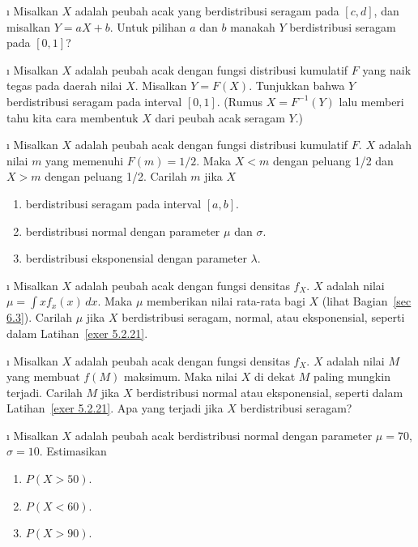 \begin{LJSItem}
\i\label{exer 5.2.19} Misalkan $X$ adalah peubah acak yang berdistribusi seragam pada
$[c,d]$, dan misalkan $Y = aX + b$.  Untuk pilihan $a$ dan $b$ manakah $Y$
berdistribusi seragam pada $[0,1]$?

\i\label{exer 5.2.20} Misalkan $X$ adalah peubah acak dengan fungsi distribusi
kumulatif $F$ yang naik tegas pada daerah nilai $X$.  Misalkan $Y = F(X)$.  Tunjukkan
bahwa $Y$ berdistribusi seragam pada interval $[0,1]$.  (Rumus $X = F^{-1}(Y)$ lalu
memberi tahu kita cara membentuk $X$ dari peubah acak seragam $Y$.)

\i\label{exer 5.2.21} Misalkan $X$ adalah peubah acak dengan fungsi distribusi
kumulatif $F$.   $X$ adalah nilai $m$ yang memenuhi $F(m) = 1/2$.  Maka
$X < m$ dengan peluang 1/2 dan $X > m$ dengan peluang 1/2.  Carilah $m$ jika $X$
\begin{enumerate}
\item berdistribusi seragam pada interval $[a,b]$.

\item berdistribusi normal dengan parameter $\mu$ dan $\sigma$.

\item berdistribusi eksponensial dengan parameter $\lambda$.
\end{enumerate}

\i\label{exer 5.2.22} Misalkan $X$ adalah peubah acak dengan fungsi densitas $f_X$.
 $X$ adalah nilai $\mu = \int xf_x(x)\,dx$.  Maka $\mu$ memberikan
nilai rata-rata bagi $X$ (lihat Bagian~\ref{sec 6.3}).  Carilah $\mu$ jika $X$
berdistribusi seragam, normal, atau eksponensial, seperti dalam
Latihan~\ref{exer 5.2.21}.

\i\label{exer 5.2.23} Misalkan $X$ adalah peubah acak dengan fungsi densitas $f_X$.
 $X$ adalah nilai $M$ yang membuat $f(M)$ maksimum.  Maka nilai $X$ di
dekat $M$ paling mungkin terjadi.  Carilah $M$ jika $X$ berdistribusi normal atau
eksponensial, seperti dalam Latihan~\ref{exer 5.2.21}.  Apa yang terjadi jika $X$
berdistribusi seragam?

\i\label{exer 5.2.24} Misalkan $X$ adalah peubah acak berdistribusi normal dengan
parameter $\mu = 70$, $\sigma = 10$.  Estimasikan
\begin{enumerate}
\item $P(X > 50)$.

\item $P(X < 60)$.

\item $P(X > 90)$.


\end{enumerate}
\end{LJSItem}
